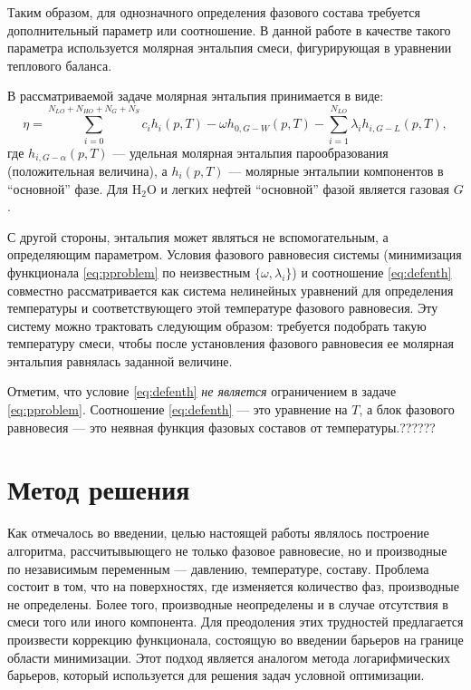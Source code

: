 \documentclass[12pt]{article}
\begin{document}
Таким образом, для однозначного определения фазового состава требуется дополнительный параметр или соотношение. В данной работе в качестве такого параметра используется молярная энтальпия смеси, фигурирующая в уравнении теплового баланса.

В рассматриваемой задаче молярная энтальпия принимается в виде:
\begin{equation}
\eta = \sum_{i=0}^{N_{LO}+N_{HO}+N_{G}+N_{S}} c_i h_i(p,T) -\omega h_{0,G-W}(p,T) -\sum_{i=1}^{N_{LO}} \lambda_i
h_{i,G-L}(p,T) , \label{eq:defenth}
\end{equation}
где $h_{i,G-\alpha}(p,T)$ --- удельная молярная энтальпия парообразования (положительная величина), а $h_i(p,T)$ --- молярные энтальпии компонентов в ``основной'' фазе. Для $\mathrm{H_2O}$ и легких нефтей ``основной'' фазой является газовая $G$.

С другой стороны, энтальпия может являться не вспомогательным, а определяющим параметром. Условия фазового равновесия системы (минимизация функционала \eqref{eq:pproblem} по неизвестным $\{\omega, \lambda_i\}$) и соотношение \eqref{eq:defenth} совместно рассматривается как система нелинейных уравнений для определения температуры и соответствующего этой температуре фазового равновесия. Эту систему можно трактовать следующим образом: требуется подобрать такую температуру смеси, чтобы после установления фазового равновесия ее молярная энтальпия равнялась заданной величине.

Отметим, что условие \eqref{eq:defenth} \emph{не является} ограничением в задаче \eqref{eq:pproblem}. Соотношение \eqref{eq:defenth} --- это уравнение на $T$, а блок фазового равновесия --- это неявная функция фазовых составов от температуры.??????


\section{Метод решения}

Как отмечалось во введении, целью настоящей работы являлось построение алгоритма, рассчитывыющего не только фазовое равновесие, но и производные по независимым переменным --- давлению, температуре, составу. Проблема состоит в том, что на поверхностях, где изменяется количество фаз, производные не определены. Более того, производные неопределены и в случае отсутствия в смеси того или иного компонента. Для преодоления этих трудностей предлагается произвести коррекцию функционала, состоящую во введении барьеров на границе области минимизации. Этот подход является аналогом метода логарифмических барьеров, который используется для решения задач условной оптимизации.
\end{document}
